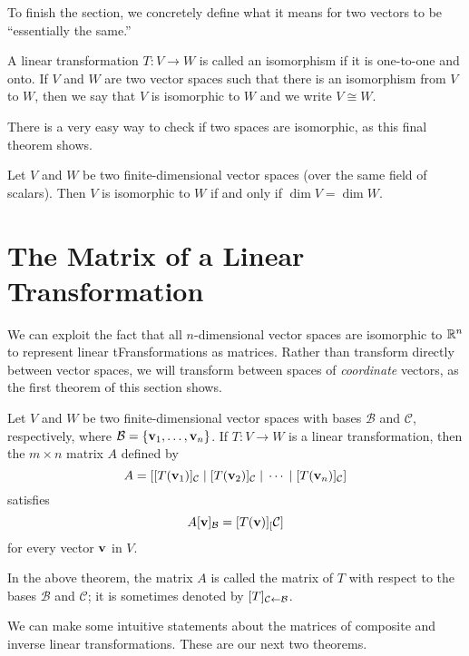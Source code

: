 \documentclass[../m73main.tex]{subfiles}
\begin{document}
To finish the section, we concretely define what it means for two vectors to be ``essentially the same.''

\begin{definition}[Isomorphism]
	A linear transformation $T : V \to W$ is called an isomorphism if it is one-to-one and onto.
	If $V$ and $W$ are two vector spaces such that there is an isomorphism from $V$ to $W$, then we say that $V$ is isomorphic to $W$ and we write $V \cong W$.
\end{definition}

There is a very easy way to check if two spaces are isomorphic, as this final theorem shows.

\begin{theorem}
	Let $V$ and $W$ be two finite-dimensional vector spaces (over the same field of scalars).
	Then $V$ is isomorphic to $W$ if and only if $\dim V = \dim W$.
\end{theorem}

\section{The Matrix of a Linear Transformation}
We can exploit the fact that all $n$-dimensional vector spaces are isomorphic to $\mathbb{R}^n$ to represent linear tFransformations as matrices.
Rather than transform directly between vector spaces, we will transform between spaces of \textit{coordinate} vectors, as the first theorem of this section shows.

\begin{theorem}
	Let $V$ and $W$ be two finite-dimensional vector spaces with bases $\mathcal{B}$ and $\mathcal{C}$, respectively, where $\mathcal{B} = \{\mathbf{v}_1, \ldots, \mathbf{v}_n\}$.
	If $T : V \to W$ is a linear transformation, then the $m \times n$ matrix $A$ defined by
	\[ A = [ [T(\mathbf{v}_1)]_{\mathcal{C}} \;|\; [T(\mathbf{v}_2)]_{\mathcal{C}} \;|\; \cdots \;|\; [T(\mathbf{v}_n)]_{\mathcal{C}} ] \]
	satisfies
	\[ A [\mathbf{v}]_{\mathcal{B}} = [T(\mathbf{v})]_[\mathcal{C}] \]
	for every vector $\mathbf{v}$ in $V$.
\end{theorem}

In the above theorem, the matrix $A$ is called the matrix of $T$ with respect to the bases $\mathcal{B}$ and $\mathcal{C}$; it is sometimes denoted by $[T]_{\mathcal{C} \leftarrow \mathcal{B}}$.

We can make some intuitive statements about the matrices of composite and inverse linear transformations.
These are our next two theorems.
\end{document}
